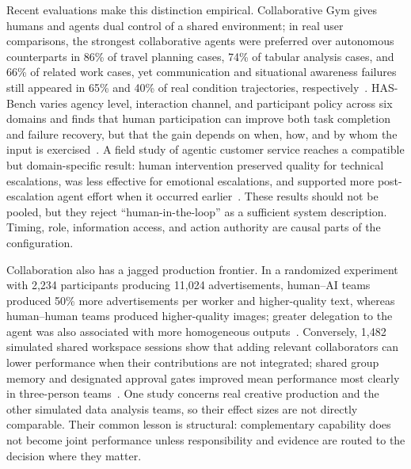 Recent evaluations make this distinction empirical. Collaborative Gym gives humans and agents dual control of a shared environment; in real user comparisons, the strongest collaborative agents were preferred over autonomous counterparts in 86\% of travel planning cases, 74\% of tabular analysis cases, and 66\% of related work cases, yet communication and situational awareness failures still appeared in 65\% and 40\% of real condition trajectories, respectively~\cite{shao2026collaborativegym}. HAS-Bench varies agency level, interaction channel, and participant policy across six domains and finds that human participation can improve both task completion and failure recovery, but that the gain depends on when, how, and by whom the input is exercised~\cite{wu2026hasbench}. A field study of agentic customer service reaches a compatible but domain-specific result: human intervention preserved quality for technical escalations, was less effective for emotional escalations, and supported more post-escalation agent effort when it occurred earlier~\cite{wang2026agentichitl}. These results should not be pooled, but they reject ``human-in-the-loop'' as a sufficient system description. Timing, role, information access, and action authority are causal parts of the configuration.

Collaboration also has a jagged production frontier. In a randomized experiment with 2,234 participants producing 11,024 advertisements, human--AI teams produced 50\% more advertisements per worker and higher-quality text, whereas human--human teams produced higher-quality images; greater delegation to the agent was also associated with more homogeneous outputs~\cite{ju2026collaborating}. Conversely, 1,482 simulated shared workspace sessions show that adding relevant collaborators can lower performance when their contributions are not integrated; shared group memory and designated approval gates improved mean performance most clearly in three-person teams~\cite{kotalwar2026synergy}. One study concerns real creative production and the other simulated data analysis teams, so their effect sizes are not directly comparable. Their common lesson is structural: complementary capability does not become joint performance unless responsibility and evidence are routed to the decision where they matter.

